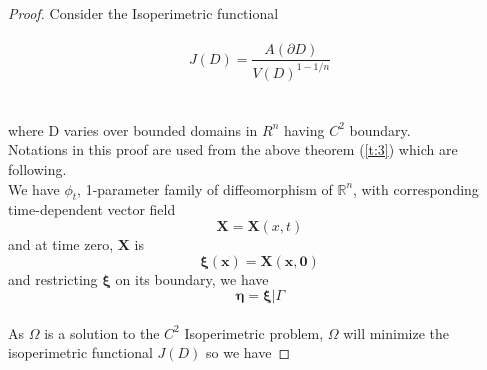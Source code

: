\documentclass[oneside]{book}
\begin{document}
	\begin{proof}
		
		Consider the Isoperimetric functional \\\\
		\begin{equation}
		\label{eq35}
		J(D)=\frac{A(\partial D)}{V(D)^{1-1 / n}}
		\end{equation}
		\\\\
		where D varies over bounded domains in $R^{n}$ having $C^{2}$ boundary.\\
		Notations in this proof are used from the above theorem (\ref{t:3}) which are \\
		following.
		\\ 
		We have $\phi_{t}$, 1-parameter family of diffeomorphism of $\mathbb{R}^{n}$, with corresponding time-dependent vector field $$\boldsymbol{X} = \boldsymbol{X}(x, t)$$ and at time zero, $\boldsymbol{X}$ is \\ $$\boldsymbol{\xi}(\boldsymbol{x})=\boldsymbol{X}(\boldsymbol{x}, \boldsymbol{0})$$ and  restricting $\boldsymbol{\xi}$ on its boundary, we have
		\\      $$\boldsymbol{\eta}=\boldsymbol{\xi} | \Gamma $$ \\
		As $\Omega$ is a solution to the  $C^{2}$ Isoperimetric problem, $\Omega$ will minimize the isoperimetric functional $J(D)$ so we have
		

\end{proof}
\end{document}
